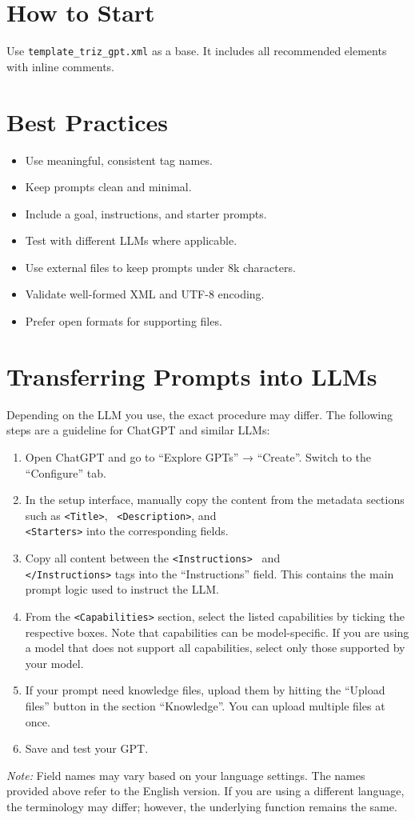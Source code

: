 \documentclass[a4paper,11pt]{refart}
\begin{document}
\section{How to Start}
Use \lstinline!template_triz_gpt.xml! as a base. It includes all recommended elements with inline comments.

\section{Best Practices}
\begin{itemize}
  \item Use meaningful, consistent tag names.
  \item Keep prompts clean and minimal.
  \item Include a goal, instructions, and starter prompts.
  \item Test with different LLMs where applicable.
  \item Use external files to keep prompts under 8k characters.
  \item Validate well-formed XML and UTF-8 encoding.
  \item Prefer open formats for supporting files.
\end{itemize}

\section{Transferring Prompts into LLMs}
Depending on the LLM you use, the exact procedure may differ. The following steps are a guideline for ChatGPT and similar LLMs:
\begin{enumerate}
  \item Open ChatGPT and go to ``Explore GPTs'' → ``Create''. Switch to the ``Configure'' tab.
  \item In the setup interface, manually copy the content from the metadata sections such as \lstinline!<Title>!, \  \lstinline!<Description>!, and \\ \lstinline!<Starters>! into the corresponding fields.
  \item Copy all content between the \lstinline!<Instructions>! \ and \\ \lstinline!</Instructions>! tags into the ``Instructions'' field. This contains the main prompt logic used to instruct the LLM.
  \item From the \lstinline!<Capabilities>! section, select the listed capabilities by ticking the respective boxes. Note that capabilities can be model-specific. If you are using a model that does not support all capabilities, select only those supported by your model.
  \item If your prompt need knowledge files, upload them by hitting the ``Upload files'' button in the section ``Knowledge''. You can upload multiple files at once.
  \item Save and test your GPT.
\end{enumerate}
\textit{Note:} Field names may vary based on your language settings. The names provided above refer to the English version. If you are using a different language, the terminology may differ; however, the underlying function remains the same.
\end{document}

